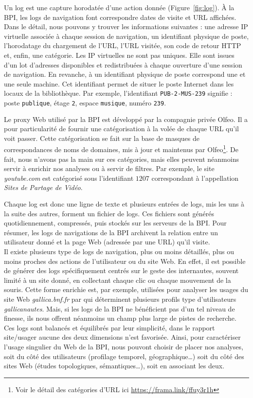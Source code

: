 \documentclass[symmetric,justified,marginals=raggedouter]{tufte-book}
\begin{document}
Un log est une capture horodatée d'une action donnée (Figure~\ref{fig:log}). À la BPI, les logs de navigation font correspondre dates de visite et URL affichées. Dans le détail, nous pouvons y trouver les informations suivantes : une adresse IP virtuelle associée à chaque session de navigation, un identifiant physique de poste, l'horodatage du chargement de l'URL, l'URL visitée, son code de retour HTTP et, enfin, une catégorie. Les IP virtuelles ne sont pas uniques. Elle sont issues d'un lot d'adresses disponibles et redistribuées à chaque ouverture d'une session de navigation. En revanche, à un identifiant physique de poste correspond une et une seule machine. Cet identifiant permet de situer le poste Internet dans les locaux de la bibliothèque. Par exemple, l'identifiant \texttt{PUB-2-MUS-239} signifie : poste \texttt{publique}, étage \texttt{2}, espace \texttt{musique}, numéro \texttt{239}.  

Le proxy Web utilisé par la BPI est développé par la compagnie privée Olfeo. Il a pour particularité de fournir une catégorisation à la volée de chaque URL qu'il voit passer. Cette catégorisation se fait sur la base de masques de correspondances de noms de domaines, mis à jour et maintenus par Olfeo\footnote{\RaggedOuter Voir le détail des catégories d'URL ici \url{https://frama.link/ffuy3r1h}}. De fait, nous n'avons pas la main sur ces catégories, mais elles peuvent néanmoins servir à enrichir nos analyses ou à servir de filtres. Par exemple, le site \textit{youtube.com} est catégorisé sous l'identifiant $1207$ correspondant à l'appellation \textit{Sites de Partage de Vidéo}.

Chaque log est donc une ligne de texte et plusieurs entrées de logs, mis les uns à la suite des autres, forment un fichier de logs. Ces fichiers sont générés quotidiennement, compressés, puis stockés sur les serveurs de la BPI. Pour résumer, les logs de navigations de la BPI archivent la relation entre un utilisateur donné et la page Web (adressée par une URL) qu'il visite. \\

\noindent Il existe plusieurs type de logs de navigation, plus ou moins détaillés, plus ou moins proches des actions de l'utilisateur ou du site Web. En effet, il est possible de générer des logs spécifiquement centrés sur le geste des internautes, souvent limité à un site donné, en collectant chaque clic ou chaque mouvement de la souris. Cette forme enrichie est, par exemple, utilisées pour analyser les usages du site Web \textit{gallica.bnf.fr} par \citep{beaudouin__2016} qui déterminent plusieurs profils type d'utilisateurs \textit{gallicanautes}. Mais, si les logs de la BPI ne bénéficient pas d'un tel niveau de finesse, ils nous offrent néanmoins un champ plus large de pistes de recherche. Ces logs sont balancés et équilibrés par leur simplicité, dans le rapport site/usager aucune des deux dimensions n'est favorisée. Ainsi, pour caractériser l'usage singulier du Web de la BPI, nous pouvont choisir de placer nos analyses, soit du côté des utilisateurs (profilage temporel, géographique\ldots{}) soit du côté des sites Web (études topologiques, sémantiques\ldots{}), soit en associant les deux.
\end{document}
